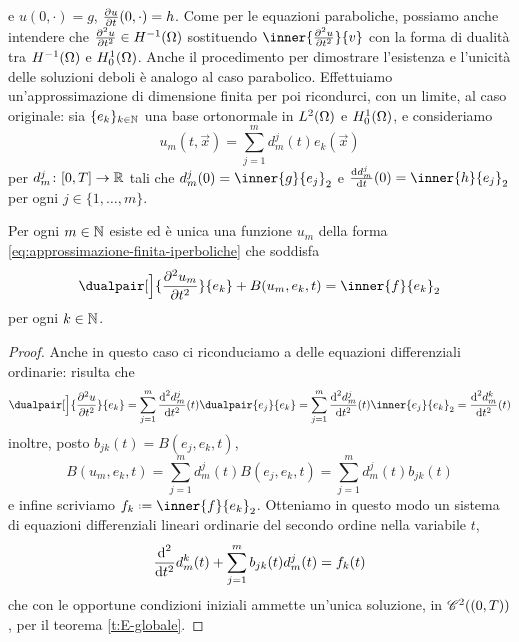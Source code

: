 e $u(0,\cdot)=g$, $\drp{u}{t}(0,\cdot)=h$.
Come per le equazioni paraboliche, possiamo anche intendere che $\ddrp{u}{t}\in\sobH[-1]{\Omega}$ sostituendo $\inner{\ddrp{u}{t}}{v}$ con la forma di dualità tra $\sobH[-1]{\Omega}$ e $\sobHc[1]{\Omega}$.
Anche il procedimento per dimostrare l'esistenza e l'unicità delle soluzioni deboli è analogo al caso parabolico.
Effettuiamo un'approssimazione di dimensione finita per poi ricondurci, con un limite, al caso originale: sia $\{e_k\}_{k\in\N}$ una base ortonormale in $\leb[2]{\Omega}$ e $\sobHc[1]{\Omega}$, e consideriamo
\begin{equation}
    u_m(t,\vec x)=\sum_{j=1}^md^j_m(t)e_k(\vec x)
    \label{eq:approssimazione-finita-iperboliche}
\end{equation}
per $d^j_m\colon[0,T]\to\R$ tali che $d^j_m(0)=\inner{g}{e_j}_2$ e $\drv{d^j_m}{t}(0)=\inner{h}{e_j}_2$ per ogni $j\in\{1,\dotsc,m\}$.
\begin{teorema} \label{t:esistenza-soluzione-approssimata-iperboliche}
    Per ogni $m\in\N$ esiste ed è unica una funzione $u_m$ della forma \eqref{eq:approssimazione-finita-iperboliche} che soddisfa
    \begin{equation}
        \dualpair[\Big]{\ddrp{u_m}{t}}{e_k}+B(u_m,e_k,t)=\inner{f}{e_k}_2
    \end{equation}
    per ogni $k\in\N$.
\end{teorema}
\begin{proof}
    Anche in questo caso ci riconduciamo a delle equazioni differenziali ordinarie: risulta che
    \begin{equation}
        \dualpair[\Big]{\ddrp{u}{t}}{e_k}=
        \sum_{j=1}^m\ddrv{d^j_m}{t}(t)\dualpair{e_j}{e_k}=
        \sum_{j=1}^m\ddrv{d^j_m}{t}(t)\inner{e_j}{e_k}_2=
        \ddrv{d^k_m}{t}(t)
    \end{equation}
    inoltre, posto $b_{jk}(t)=B(e_j,e_k,t)$,
    \begin{equation}
        B(u_m,e_k,t)=
        \sum_{j=1}^md^j_m(t)B(e_j,e_k,t)=
        \sum_{j=1}^md^j_m(t)b_{jk}(t)
    \end{equation}
    e infine scriviamo $f_k\defeq\inner{f}{e_k}_2$.
    Otteniamo in questo modo un sistema di equazioni differenziali lineari ordinarie del secondo ordine nella variabile $t$,
    \begin{equation}
        \ddrv{}{t}d^k_m(t)+\sum_{j=1}^mb_{jk}(t)d^j_m(t)=f_k(t)
    \end{equation}
    che con le opportune condizioni iniziali ammette un'unica soluzione, in $\cont[2]{(0,T)}$, per il teorema \ref{t:E-globale}.
\end{proof}

